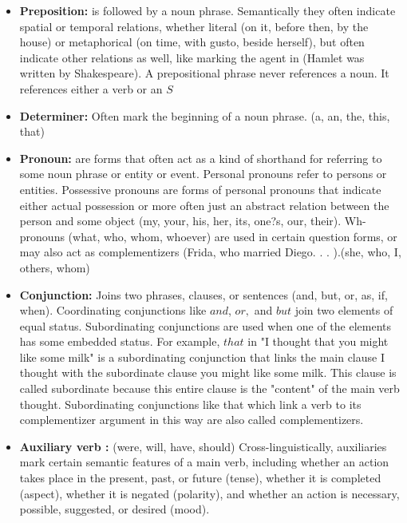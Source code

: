 \documentclass[11pt]{article}
\begin{document}
	\begin{itemize}
		\item \textbf{Preposition:} is followed by a noun phrase. Semantically they often indicate spatial or temporal relations, 
		whether literal (on it, before then, by the house) or metaphorical (on time, with gusto, beside herself), but often indicate 
		other relations as well, like marking the agent in (Hamlet was written by Shakespeare). A prepositional phrase never 
		references a noun. It references either a verb or an $S$
		
		\item \textbf{Determiner:} Often mark the beginning of a noun phrase. (a, an, the, this, that)

		\item \textbf{Pronoun:} are forms that often act as a kind of shorthand for referring to some noun phrase or entity or 
			event. Personal pronouns refer to persons or entities. Possessive pronouns are forms of personal pronouns that 
			indicate either actual possession or more often just an abstract relation between the person and some object 
			(my, your, his, her, its, one?s, our, their). Wh-pronouns (what, who, whom, whoever) are used in certain question 
			forms, or may also act as complementizers (Frida, who married Diego. . . ).(she, who, I, others, whom)
		
		\item \textbf{Conjunction:} Joins two phrases, clauses, or sentences (and, but, or, as, if, when). Coordinating 
			conjunctions like $and$, $or,$ and $but$ join two elements of equal status. Subordinating conjunctions are used 
			when one of the elements has some embedded status. For example, $that$ in "I thought that you might like some 
			milk" is a subordinating conjunction that links the main clause I thought with the subordinate clause you might like 
			some milk. This clause is called subordinate because this entire clause is the "content" of the main verb thought. 
			Subordinating conjunctions like that which link a verb to its complementizer argument in this way are also called 
			complementizers.

		\item \textbf{Auxiliary verb :}  (were, will, have, should) Cross-linguistically, auxiliaries mark certain semantic features of 
			a main verb, including whether an action takes place in the present, past, or future (tense), whether it is 
			completed (aspect), whether it is negated (polarity), and whether an action is necessary, possible, suggested, or 
			desired (mood).
		

\end{itemize}
\end{document}
